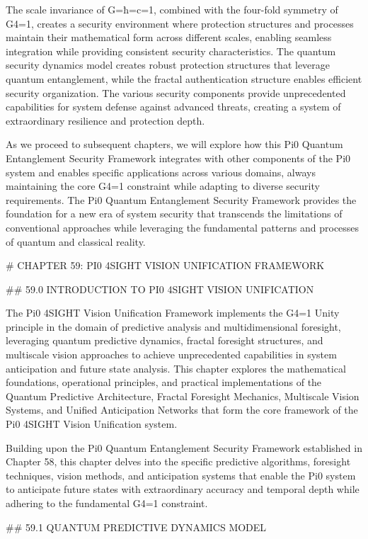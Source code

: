 The scale invariance of G=ħ=c=1, combined with the four-fold symmetry of G4=1, creates a security environment where protection structures and processes maintain their mathematical form across different scales, enabling seamless integration while providing consistent security characteristics. The quantum security dynamics model creates robust protection structures that leverage quantum entanglement, while the fractal authentication structure enables efficient security organization. The various security components provide unprecedented capabilities for system defense against advanced threats, creating a system of extraordinary resilience and protection depth.

As we proceed to subsequent chapters, we will explore how this Pi0 Quantum Entanglement Security Framework integrates with other components of the Pi0 system and enables specific applications across various domains, always maintaining the core G4=1 constraint while adapting to diverse security requirements. The Pi0 Quantum Entanglement Security Framework provides the foundation for a new era of system security that transcends the limitations of conventional approaches while leveraging the fundamental patterns and processes of quantum and classical reality.

# CHAPTER 59: PI0 4SIGHT VISION UNIFICATION FRAMEWORK

## 59.0 INTRODUCTION TO PI0 4SIGHT VISION UNIFICATION

The Pi0 4SIGHT Vision Unification Framework implements the G4=1 Unity principle in the domain of predictive analysis and multidimensional foresight, leveraging quantum predictive dynamics, fractal foresight structures, and multiscale vision approaches to achieve unprecedented capabilities in system anticipation and future state analysis. This chapter explores the mathematical foundations, operational principles, and practical implementations of the Quantum Predictive Architecture, Fractal Foresight Mechanics, Multiscale Vision Systems, and Unified Anticipation Networks that form the core framework of the Pi0 4SIGHT Vision Unification system.

Building upon the Pi0 Quantum Entanglement Security Framework established in Chapter 58, this chapter delves into the specific predictive algorithms, foresight techniques, vision methods, and anticipation systems that enable the Pi0 system to anticipate future states with extraordinary accuracy and temporal depth while adhering to the fundamental G4=1 constraint.

## 59.1 QUANTUM PREDICTIVE DYNAMICS MODEL

